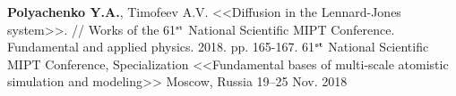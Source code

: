 \begin{cventries}
    
  \cventry
    {\textbf{Polyachenko Y.A.}, Timofeev A.V. <<Diffusion in the Lennard-Jones system>>. // Works of the 61$^{\texttt{\tiny st}}$ National Scientific MIPT Conference. Fundamental and applied physics. 2018. pp. 165-167.} %
    {61$^{\textbf{\tiny st}}$ National Scientific MIPT Conference, Specialization <<Fundamental bases of multi-scale atomistic simulation and modeling>>} %
    {Moscow, Russia} %
    {19--25 Nov. 2018} %
    {}
    

\end{cventries}
